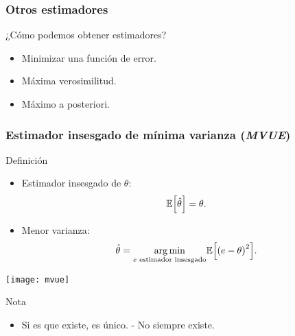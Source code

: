 \documentclass[table]{beamer}
\begin{document}
\begin{frame}
    \frametitle{Otros estimadores}
    \begin{block}{¿Cómo podemos obtener estimadores?}
        \begin{itemize}
            \item Minimizar una función de error.
            \item Máxima verosimilitud.
            \item Máximo a posteriori.
        \end{itemize}
    \end{block}
\end{frame}

\begin{frame}
    \frametitle{Estimador insesgado de mínima varianza (\emph{MVUE})}
    \begin{block}{Definición}
        \begin{itemize}
            \item Estimador insesgado de $\theta$:
                \begin{equation*}
                    \expected{\hat{\theta}} = \theta .
                \end{equation*}
            \item Menor varianza:
                \begin{equation*}
                    \hat{\theta} = \underset{e \text{ estimador insesgado}}{\arg \min} \expected{\parens{e - \theta}^{2}} .
                \end{equation*}
        \end{itemize}
    \end{block}
    \begin{center}
        \texttt{[image: mvue]}
    \end{center}
    \begin{block}{Nota}
        \begin{itemize}
            \item Si es que existe, es único. - No siempre existe.
        \end{itemize}
    \end{block}
\end{frame}
\end{document}
